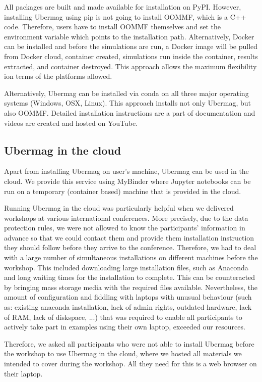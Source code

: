 \documentclass{deliverablereport}
\begin{document}
All packages are built and made available for installation on
PyPI. However, installing Ubermag using pip is not going to install
OOMMF, which is a C++ code. Therefore, users have to install OOMMF
themselves and set the environment variable which points to the
installation path. Alternatively, Docker can be installed and before
the simulations are run, a Docker image will be pulled from Docker
cloud, container created, simulations run inside the container,
results extracted, and container destroyed. This approach allows the
maximum flexibility ion terms of the platforms allowed.

Alternatively, Ubermag can be installed via conda on all three major
operating systems (Windows, OSX, Linux). This approach installs not
only Ubermag, but also OOMMF. Detailed installation instructions are a
part of documentation and videos are created and hosted on YouTube.

\subsection{Ubermag in the cloud}

Apart from installing Ubermag on user's machine, Ubermag can be used
in the cloud. We provide this service using MyBinder where Jupyter
notebooks can be run on a temporary (container based) machine that is
provided in the cloud.

Running Ubermag in the cloud was particularly helpful when we
delivered workshops at various international conferences. More
precisely, due to the data protection rules, we were not allowed to
know the participants' information in advance so that we could contact
them and provide them installation instruction they should follow
before they arrive to the conference. Therefore, we had to deal with a
large number of simultaneous installations on different machines
before the workshop. This included downloading large installation
files, such as Anaconda and long waiting times for the installation to
complete. This can be counteracted by bringing mass storage media with
the required files available. Nevertheless, the amount of
configuration and fiddling with laptops with unusual behaviour (such
as: existing anaconda installation, lack of admin rights, outdated
hardware, lack of RAM, lack of diskspace, ...) that was required to
enable all participants to actively take part in examples using their
own laptop, exceeded our resources.

Therefore, we asked all participants who were not able to
install Ubermag before the workshop to use Ubermag in the cloud, where
we hosted all materials we intended to cover during the workshop. All
they need for this is a web browser on their laptop.
\end{document}
